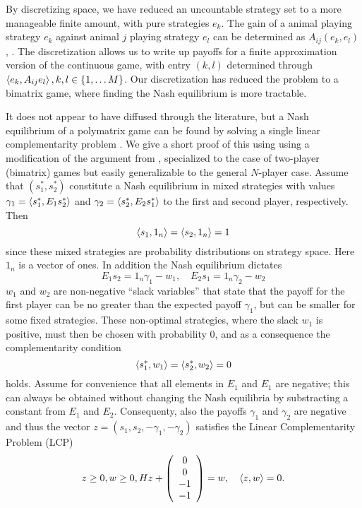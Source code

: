 By discretizing space, we have reduced an uncountable strategy set to a more manageable finite amount, with pure strategies $e_k$. The gain of a animal playing strategy $e_k$ against animal $j$ playing strategy $e_l$ can be determined as $A_{ij}(e_k,e_l)$, . The discretization allows us to write up payoffs for a finite approximation version of the continuous game,  with entry $(k,l)$ determined through $\left \langle e_k,A_{ij}e_l \right \rangle, k,l \in \{1,\dots M\}$.
Our discretization has reduced the problem to a bimatrix game, where finding the Nash equilibrium is more tractable.

It does not appear to have diffused through the literature, but a Nash equilibrium of a polymatrix game can be found by solving a single linear complementarity problem \citep{miller1991copositive}. We give a short proof of this using using a modification of the argument from \citep{miller1991copositive}, specialized to the case of two-player (bimatrix) games but easily generalizable to the general $N$-player case. Assume that $(s^*_1,s^*_2)$ constitute a Nash equilibrium in mixed strategies with values $\gamma_1 = \left \langle s^*_1,E_1 s^*_2 \right \rangle$ and  $\gamma_2 = \left \langle s^*_2,E_2 s^*_1 \right \rangle$ to the first and second player, respectively. Then
\[
  \left \langle s_1,1_n \right \rangle =
  \left \langle s_2,1_n \right \rangle =
  1
\]
since these mixed strategies are probability distributions on strategy space. Here $1_n$ is a vector of ones. In addition the Nash equilibrium dictates
\[
  E_1 s_2 = 1_n \gamma_1 - w_1
  ,\quad
  E_2 s_1 = 1_n \gamma_2  - w_2
\]
$w_1$ and $w_2$ are non-negative ``slack variables'' that state that the payoff for the first player can be no greater than the expected payoff $\gamma_1$, but can be smaller for some fixed strategies. These non-optimal strategies, where the slack $w_1$ is positive, must then be chosen with probability 0, and as a consequence the complementarity condition
\[
  \left \langle s^*_1,w_1 \right \rangle =   \left \langle s^*_2,w_2 \right \rangle = 0
\]
holds. Assume for convenience that all elements in $E_1$ and $E_1$ are negative; this can always be obtained without changing the Nash equilibria by substracting a constant from $E_1$ and $E_2$. Consequenty, also the payoffs $\gamma_1$ and $\gamma_2$ are negative and thus the vector $z = (s_1,s_2,-\gamma_1,-\gamma_2)$ satisfies the Linear Complementarity Problem (LCP)
\[
\label{eq:lcp}
  z \geq 0,
  w \geq 0 ,
  H
  z
  +
  \left(
    \begin{array}{c}
      0 \\
      0 \\
      -1 \\
      -1
    \end{array}
  \right)
  =
  w
  ,
  \quad
  \left \langle z,w \right \rangle = 0
  .
\]
